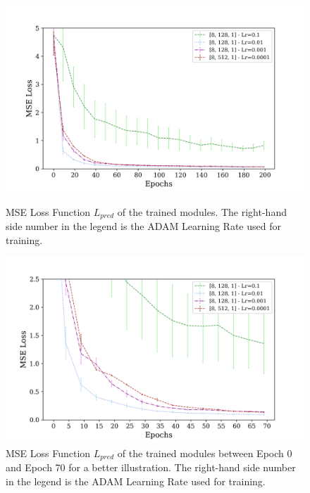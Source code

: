         \begin{figure}[hbtp]
                \centering
                \includegraphics[width=15cm, keepaspectratio]{images/results/module_lr_2.png}
                \caption{MSE Loss Function $L_{pred}$ of the trained modules. The right-hand side number in the legend is the ADAM Learning Rate used for training.}
                \label{fig:results_lr_2}
                
                \vspace{1.0cm}
                
                \includegraphics[width=15cm, keepaspectratio]{images/results/module_lr_1.png}
                \caption{MSE Loss Function $L_{pred}$ of the trained modules between Epoch 0 and Epoch 70 for a better illustration. The right-hand side number in the legend is the ADAM Learning Rate used for training.}
                \label{fig:results_lr_1}
        \end{figure}
        
